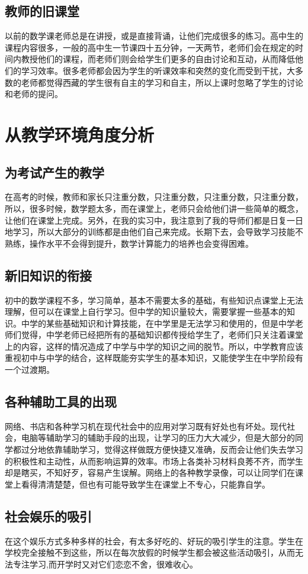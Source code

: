 \subsection{教师的旧课堂}

以前的数学课老师总是在讲授，或是直接背诵，让他们完成很多的练习。高中生的课程内容很多，一般的高中生一节课四十五分钟，一天两节，老师们会在规定的时间内教授他们的课程，而老师们则会给学生们更多的自由讨论和互动，从而降低他们的学习效率。很多老师都会因为学生的听课效率和突然的变化而受到干扰，大多数的老师都觉得西藏的学生很有自主的学习和自主，所以上课时忽略了学生的讨论和老师的提问。



\section{从教学环境角度分析}

\subsection{为考试产生的教学}

在高考的时候，教师和家长只注重分数，只注重分数，只注重分数，只注重分数，所以，很多时候，数学题太多，而在课堂上，老师只会给他们讲一些简单的概念，让他们在课堂上完成。另外，在我的实习中，我注意到了我的导师们都是日复一日地学习，所以大部分的训练都是由他们自己来完成。长期下去，会导致学习技能不熟练，操作水平不会得到提升，数学计算能力的培养也会变得困难。


\subsection{新旧知识的衔接}

初中的数学课程不多，学习简单，基本不需要太多的基础，有些知识点课堂上无法理解，但可以在课堂上自行学习。但中学的知识量较大，需要掌握一些基本的知识。中学的某些基础知识和计算技能，在中学里是无法学习和使用的，但是中学老师们觉得，中学老师已经把所有的基础知识都传授给学生了，老师们只关注着课堂上的内容，这样的情况造成了中学与中学的知识之间的脱节。所以，中学教育应该重视初中与中学的结合，这样既能夯实学生的基本知识，又能使学生在中学阶段有一个过渡期。


\subsection{各种辅助工具的出现}

网络、书店和各种学习机在现代社会中的应用对学习既有好处也有坏处。现代社会，电脑等辅助学习的辅助手段的出现，让学习的压力大大减少，但是大部分的同学都过分地依靠辅助学习，觉得这样做既方便快捷又准确，反而会让他们失去学习的积极性和主动性，从而影响运算的效率。市场上各类补习材料良莠不齐，而学生却是瞎买，不知好歹，容易产生误解。网络上的各种教学录像，可以让同学们在课堂上看得清清楚楚，但也有可能导致学生在课堂上不专心，只能靠自学。


\subsection{社会娱乐的吸引}

在这个娱乐方式多种多样的社会，有太多好吃的、好玩的吸引学生的注意。学生在学校完全接触不到这些，所以在每次放假的时候学生都会被这些活动吸引，从而无法专注学习,而开学时又对它们恋恋不舍，很难收心。
